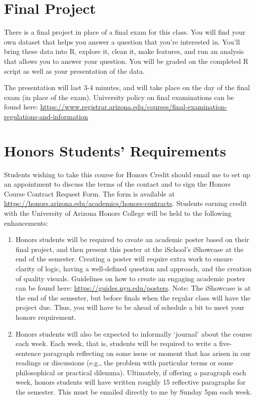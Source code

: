 \documentclass[
]{book}
\begin{document}
\hypertarget{final-project}{%
\section{Final Project}\label{final-project}}

There is a final project in place of a final exam for this class. You will find your own dataset that helps you answer a question that you're interested in. You'll bring these data into R, explore it, clean it, make features, and run an analysis that allows you to answer your question. You will be graded on the completed R script as well as your presentation of the data.

The presentation will last 3-4 minutes, and will take place on the day of the final exam (in place of the exam). University policy on final examinations can be found here: \url{https://www.registrar.arizona.edu/courses/final-examination-regulations-and-information}

\hypertarget{honors-students-requirements}{%
\section{Honors Students' Requirements}\label{honors-students-requirements}}

Students wishing to take this course for Honors Credit should email me to set up an appointment to discuss the terms of the contact and to sign the Honors Course Contract Request Form. The form is available at \url{https://honors.arizona.edu/academics/honors-contracts}. Students earning credit with the University of Arizona Honors College will be held to the following enhancements:

\begin{enumerate}
\def\labelenumi{\arabic{enumi}.}
\item
  Honors students will be required to create an academic poster based on their final project, and then present this poster at the iSchool's iShowcase at the end of the semester. Creating a poster will require extra work to ensure clarity of logic, having a well-defined question and approach, and the creation of quality visuals. Guidelines on how to create an engaging academic poster can be found here: \url{https://guides.nyu.edu/posters}. Note: The iShowcase is at the end of the semester, but before finals when the regular class will have the project due. Thus, you will have to be ahead of schedule a bit to meet your honors requirement.
\item
  Honors students will also be expected to informally `journal' about the course each week. Each week, that is, students will be required to write a five-sentence paragraph reflecting on some issue or moment that has arisen in our readings or discussions (e.g., the problem with particular terms or some philosophical or practical dilemma). Ultimately, if offering a paragraph each week, honors students will have written roughly 15 reflective paragraphs for the semester. This must be emailed directly to me by Sunday 5pm each week.
\end{enumerate}
\end{document}
